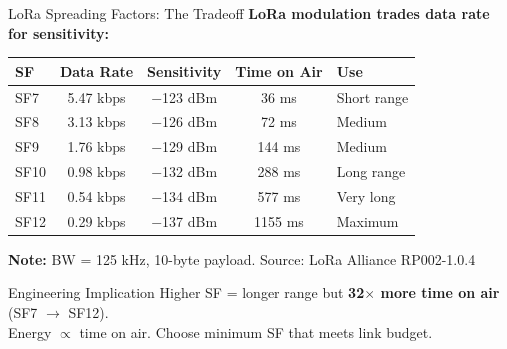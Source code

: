 \documentclass[aspectratio=169,11pt]{beamer}
\begin{document}
\begin{frame}{LoRa Spreading Factors: The Tradeoff}
    \textbf{LoRa modulation trades data rate for sensitivity:}
    
    \vspace{0.3cm}
    \begin{table}
        \centering
        \small
        \begin{tabular}{@{}lcccl@{}}
            \toprule
            \textbf{SF} & \textbf{Data Rate} & \textbf{Sensitivity} & \textbf{Time on Air} & \textbf{Use} \\
            \midrule
            SF7 & 5.47 kbps & $-$123 dBm & 36 ms & Short range \\
            SF8 & 3.13 kbps & $-$126 dBm & 72 ms & Medium \\
            SF9 & 1.76 kbps & $-$129 dBm & 144 ms & Medium \\
            SF10 & 0.98 kbps & $-$132 dBm & 288 ms & Long range \\
            SF11 & 0.54 kbps & $-$134 dBm & 577 ms & Very long \\
            SF12 & 0.29 kbps & $-$137 dBm & 1155 ms & Maximum \\
            \bottomrule
        \end{tabular}
    \end{table}
    
    \vspace{0.2cm}
    \textbf{Note:} BW = 125 kHz, 10-byte payload. Source: LoRa Alliance RP002-1.0.4
    
    \vspace{0.2cm}
    \begin{alertblock}{Engineering Implication}
        Higher SF = longer range but \textbf{32$\times$ more time on air} (SF7 $\rightarrow$ SF12).\\
        Energy $\propto$ time on air. Choose minimum SF that meets link budget.
    \end{alertblock}
\end{frame}
\end{document}
